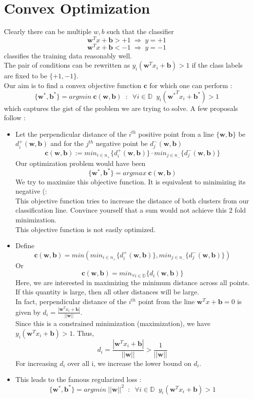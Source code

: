 \documentclass[12pt]{article}
\begin{document}
\section{Convex Optimization}
Clearly there can be multiple $w,b$ such that the classifier
$$\mathbf{w}^Tx + \mathbf{b} > +1 \; \Rightarrow \; y=+1$$
$$\mathbf{w}^Tx + \mathbf{b} < -1 \; \Rightarrow \; y=-1$$
classifies the training data reasonably well.\\[2mm] 
The pair of conditions can be rewritten as $ y_i(\mathbf{w}^Tx_i+\mathbf{b}) > 1$ if the class labels are fixed to be $\{+1,-1\}$.\\[1mm] 
Our aim is to find a convex objective function $\mathbf{c}$ for which one can perform : 
$$\{\mathbf{w}^*,\mathbf{b}^*\}=argmin \; \mathbf{c(w,b)} \;\; : \;\; \forall i \in \mathbb{D}\;\; y_i({\mathbf{w}^*}^Tx_i+\mathbf{b}^*) > 1$$
which captures the gist of the problem we are trying to solve. A few proposals follow :
\begin{itemize}
    \item Let the perpendicular distance of the $i^{th}$ positive point from a line $\{\mathbf{w},\mathbf{b}\}$ be $d_i^+(\mathbf{w},\mathbf{b})$ and for the $j^{th}$ negative point be $d_j^-(\mathbf{w},\mathbf{b})$
    $$\mathbf{c(w,b)}:=min_{i\in n_+}\{d_i^+(\mathbf{w},\mathbf{b})\} \cdot min_{j\in n_-}\{d_j^-(\mathbf{w},\mathbf{b})\}$$
    Our optimization problem would have been
    $$\{\mathbf{w}^*,\mathbf{b}^*\}=argmax \; \mathbf{c(w,b)}$$
    We try to maximize this objective function. It is equivalent to minimizing its negative (:\\[1mm]
    This objective function tries to increase the distance of both clusters from our classification line. Convince yourself that a sum would not achieve this 2 fold minimization.\\[1mm]
    This objective function is not easily optimized.
    \item Define 
    $$\mathbf{c(w,b)}=min(min_{i\in n_+}\{d_i^+(\mathbf{w},\mathbf{b})\},min_{ j\in n_-}\{d_j^-(\mathbf{w},\mathbf{b})\})$$ 
    Or
    $$\mathbf{c(w,b)}=min_{\forall i\in \mathbb{D}}\{d_i(\mathbf{w},\mathbf{b})\}$$
    Here, we are interested in maximizing the minimum distance across all points. If this quantity is large, then all other distances will be large.\\
    In fact, perpendicular distance of the $i^{th}$ point from the line $\mathbf{w}^Tx+\mathbf{b}=0$ is given by $d_i=\frac{|\mathbf{w}^Tx_i+\mathbf{b}|}{||\mathbf{w}||}$.\\[1mm] 
    Since this is a constrained minimization (maximization), we have $y_i(\mathbf{w}^Tx_i+\mathbf{b}) > 1$. Thus,
    $$d_i=\frac{|\mathbf{w}^Tx_i+\mathbf{b}|}{||\mathbf{w}||} > \frac{1}{||\mathbf{w}||}$$ 
    For increasing $d_i$ over all i, we increase the lower bound on $d_i$.
    \item This leads to the famous regularized loss : 
    $$\{\mathbf{w}^*,\mathbf{b}^*\}=argmin \; ||\mathbf{w}||^2\;\; : \;\;\forall i \in \mathbb{D}\;\; y_i(\mathbf{w}^Tx_i+\mathbf{b}) > 1$$
\end{itemize}
\end{document}
